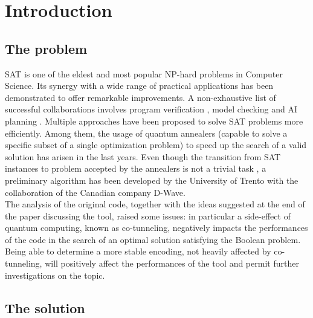 \chapter{Introduction}
\label{cha:intro}

\section{The problem}

SAT is one of the eldest and most popular NP-hard problems in Computer Science. Its synergy with a wide range of practical applications has been demonstrated to offer remarkable improvements. A non-exhaustive list of successful collaborations involves program verification \cite{pa14}, model checking \cite{pa29} and AI planning \cite{aiplan}. Multiple approaches have been proposed to solve SAT problems more efficiently. Among them, the usage of quantum annealers (capable to solve a specific subset of a single optimization problem) to speed up the search of a valid solution has arisen in the last years. Even though the transition from SAT instances to problem accepted by the annealers is not a trivial task \cite{pa22}, a preliminary algorithm has been developed by the University of Trento with the collaboration of the Canadian company D-Wave. \\
The analysis of the original code, together with the ideas suggested at the end of the paper discussing the tool, raised some issues: in particular a side-effect of quantum computing, known as co-tunneling, negatively impacts the performances of the code in the search of an optimal solution satisfying the Boolean problem. Being able to determine a more stable encoding, not heavily affected by co-tunneling, will positively affect the performances of the tool and permit further investigations on the topic.


\section{The solution}

